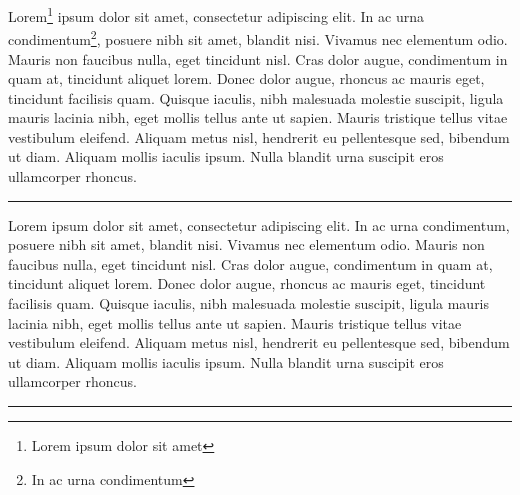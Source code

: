 \documentclass[
]{book}
\author{}
\date{}
\newenvironment{Shaded}{}{}
\newcommand{\NormalTok}[1]{#1}
\newenvironment{env-e5569ee4-b168-4c9c-aea2-98c9716ee01b}
{
    \savenotes\tcolorbox[blanker,left=5pt,borderline west={2pt}{-4pt}{black}]
}
{
    \endtcolorbox\spewnotes
}
\begin{document}
\frontmatter

\mainmatter
Lorem\footnote{Lorem ipsum dolor sit amet} ipsum dolor sit amet,
consectetur adipiscing elit. In ac urna condimentum\footnote{In ac urna
  condimentum}, posuere nibh sit amet, blandit nisi. Vivamus nec
elementum odio. Mauris non faucibus nulla, eget tincidunt nisl. Cras
dolor augue, condimentum in quam at, tincidunt aliquet lorem. Donec
dolor augue, rhoncus ac mauris eget, tincidunt facilisis quam. Quisque
iaculis, nibh malesuada molestie suscipit, ligula mauris lacinia nibh,
eget mollis tellus ante ut sapien. Mauris tristique tellus vitae
vestibulum eleifend. Aliquam metus nisl, hendrerit eu pellentesque sed,
bibendum ut diam. Aliquam mollis iaculis ipsum. Nulla blandit urna
suscipit eros ullamcorper rhoncus.

\begin{center}\rule{0.5\linewidth}{0.5pt}\end{center}

\begin{env-e5569ee4-b168-4c9c-aea2-98c9716ee01b}

\begin{Shaded}
\begin{Highlighting}[]
\NormalTok{Lorem ipsum dolor sit amet, consectetur adipiscing elit.}
\NormalTok{In ac urna condimentum, posuere nibh sit amet, blandit}
\NormalTok{nisi. Vivamus nec elementum odio. Mauris non faucibus}
\NormalTok{nulla, eget tincidunt nisl. Cras dolor augue,}
\NormalTok{condimentum in quam at, tincidunt aliquet lorem. Donec}
\NormalTok{dolor augue, rhoncus ac mauris eget, tincidunt}
\NormalTok{facilisis quam. Quisque iaculis, nibh malesuada molestie}
\NormalTok{suscipit, ligula mauris lacinia nibh, eget mollis tellus}
\NormalTok{ante ut sapien. Mauris tristique tellus vitae vestibulum}
\NormalTok{eleifend. Aliquam metus nisl, hendrerit eu pellentesque}
\NormalTok{sed, bibendum ut diam. Aliquam mollis iaculis ipsum.}
\NormalTok{Nulla blandit urna suscipit eros ullamcorper rhoncus.}
\end{Highlighting}
\end{Shaded}

\end{env-e5569ee4-b168-4c9c-aea2-98c9716ee01b}

\begin{center}\rule{0.5\linewidth}{0.5pt}\end{center}
\end{document}
